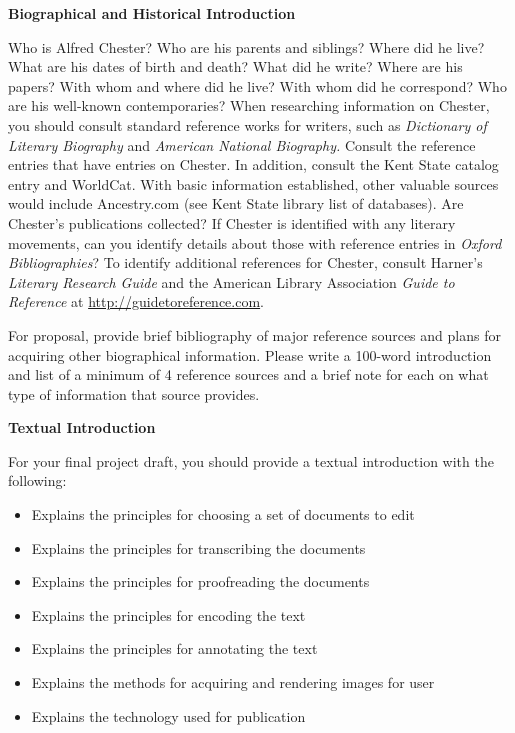 \documentclass[9pt,oneside,notitlepageletterpaperopenright]{article}
\begin{document}
\textbf{Biographical and Historical Introduction}

Who is Alfred Chester? Who are his parents and siblings? Where did he
live? What are his dates of birth and death? What did he write? Where
are his papers? With whom and where did he live? With whom did he
correspond? Who are his well-known contemporaries? When researching
information on Chester, you should consult standard reference works for
writers, such as \emph{Dictionary of Literary Biography} and
\emph{American National Biography.} Consult the reference entries that
have entries on Chester. In addition, consult the Kent State catalog
entry and WorldCat. With basic information established, other valuable
sources would include Ancestry.com (see Kent State library list of
databases). Are Chester's publications collected? If Chester is
identified with any literary movements, can you identify details about
those with reference entries in \emph{Oxford Bibliographies}? To
identify additional references for Chester, consult Harner's
\emph{Literary Research Guide} and the American Library Association
\emph{Guide to Reference} at \url{http://guidetoreference.com}.

For proposal, provide brief bibliography of major reference sources and
plans for acquiring other biographical information. Please write a
100-word introduction and list of a minimum of 4 reference sources and a
brief note for each on what type of information that source provides.

\textbf{Textual Introduction}

For your final project draft, you should provide a textual introduction
with the following:

\begin{itemize}
\itemsep1pt\parskip0pt
\item
  Explains the principles for choosing a set of documents to edit
\item
  Explains the principles for transcribing the documents
\item
  Explains the principles for proofreading the documents
\item
  Explains the principles for encoding the text
\item
  Explains the principles for annotating the text
\item
  Explains the methods for acquiring and rendering images for user
\item
  Explains the technology used for publication
\end{itemize}
\end{document}
